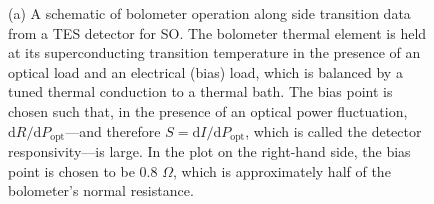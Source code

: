 \begin{figure}[!t]
    \centering
    \caption[Description of bolometer operation]{(a) A schematic of bolometer operation along side transition data from a TES detector for SO. The bolometer thermal element is held at its superconducting transition temperature in the presence of an optical load and an electrical (bias) load, which is balanced by a tuned thermal conduction to a thermal bath. The bias point is chosen such that, in the presence of an optical power fluctuation, $\mathrm{d}R / \mathrm{d}P_{\mathrm{opt}}$---and therefore $S = \mathrm{d}I / \mathrm{d}P_{\mathrm{opt}}$, which is called the detector responsivity---is large. In the plot on the right-hand side, the bias point is chosen to be 0.8 $\Omega$, which is approximately half of the bolometer's normal resistance.}
    \label{fig:bolometer_operation}
\end{figure}

